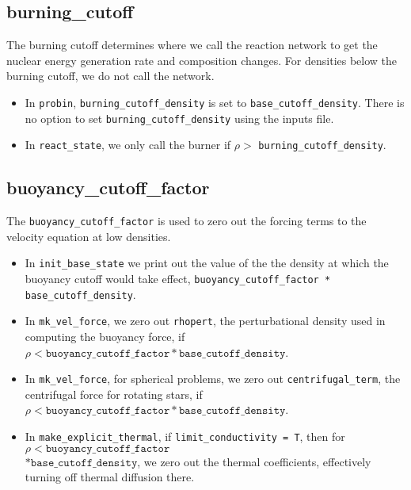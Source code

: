 \subsection{burning\_cutoff}

The burning cutoff determines where we call the reaction network to
get the nuclear energy generation rate and composition changes.  For
densities below the burning cutoff, we do not call the network.

\begin{itemize}

\item In {\tt probin}, {\tt burning\_cutoff\_density} is set to 
  {\tt base\_cutoff\_density}.  There is no option to set 
  {\tt burning\_cutoff\_density} using the inputs file.

\item In {\tt react\_state}, we only call the burner if 
  $\rho >$ {\tt burning\_cutoff\_density}.


\end{itemize}


\subsection{buoyancy\_cutoff\_factor}

The {\tt buoyancy\_cutoff\_factor} is used to zero out the forcing terms
to the velocity equation at low densities.

\begin{itemize}

\item In {\tt init\_base\_state} we print out the value of the
   the density at which the buoyancy cutoff would take effect,
   {\tt buoyancy\_cutoff\_factor * base\_cutoff\_density}.

\item In {\tt mk\_vel\_force}, we zero out {\tt rhopert}, the
   perturbational density used in computing the buoyancy force,
   if $\rho < \mathtt{buoyancy\_cutoff\_factor * base\_cutoff\_density}$.

\item In {\tt mk\_vel\_force}, for spherical problems, we 
   zero out {\tt centrifugal\_term}, the centrifugal force for
   rotating stars, if $\rho < \mathtt{buoyancy\_cutoff\_factor *
   base\_cutoff\_density}$.

\item In {\tt make\_explicit\_thermal}, if {\tt limit\_conductivity = T}, then for 
$\rho < \mathtt{buoyancy\_cutoff\_factor}$ \\ $* \mathtt{base\_cutoff\_density}$, we
zero out the thermal coefficients, effectively turning off thermal
diffusion there.

\end{itemize}





